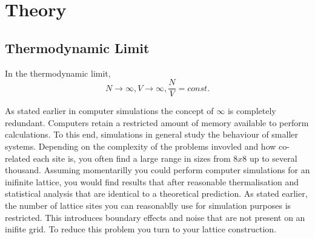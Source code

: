 \chapter{Theory}

\section{Thermodynamic Limit}
In the thermodynamic limit,
\begin{equation}
	N\rightarrow\infty, V\rightarrow\infty, \frac{N}{V} = const.
\end{equation}

As stated earlier in computer simulations the concept of $\infty$ is completely redundant.
Computers retain a restricted amount of memory available to perform calculations.
To this end, simulations in general study the behaviour of smaller systems.
Depending on the complexity of the problems invovled and how co-related each site is, you often find a large range in sizes from $8x8$ up to several thousand.
Assuming momentarilly you could perform computer simulations for an inifinite lattice, you would find results that after reasonable thermalisation and statistical analysis that are identical to a theoretical prediction.
As stated earlier, the number of lattice sites you can reasonablly use for simulation purposes is restricted.
This introduces boundary effects and noise that are not present on an inifite grid.
To reduce this problem you turn to your lattice construction.

